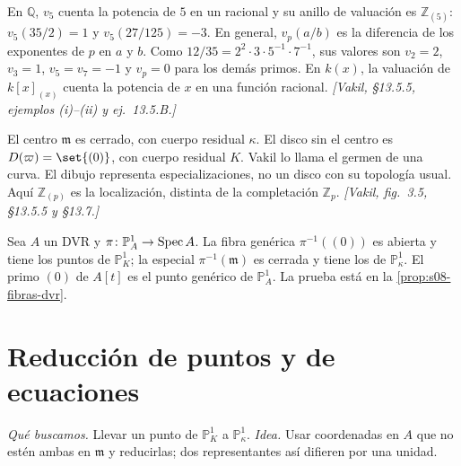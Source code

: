 \begin{ejem}[Valuaciones]
\label{ejem:s09-valuaciones}
En $\mathbb Q$, $v_5$ cuenta la potencia de $5$ en un racional y su anillo de valuación es $\mathbb Z_{(5)}$: $v_5(35/2)=1$ y $v_5(27/125)=-3$. En general, $v_p(a/b)$ es la diferencia de los exponentes de $p$ en $a$ y $b$. Como $12/35=2^2\cdot3\cdot5^{-1}\cdot7^{-1}$, sus valores son $v_2=2$, $v_3=1$, $v_5=v_7=-1$ y $v_p=0$ para los demás primos. En $k(x)$, la valuación de $k[x]_{(x)}$ cuenta la potencia de $x$ en una función racional. \emph{[Vakil, \S13.5.5, ejemplos (i)--(ii) y ej.~13.5.B.]}
\end{ejem}

\begin{center}
\begin{minipage}{.32\textwidth}
\centering
{}
\end{minipage}\hfill
\begin{minipage}{.63\textwidth}
El centro $\mathfrak m$ es cerrado, con cuerpo residual $\kappa$. El disco sin el centro es $D(\varpi)=\set{(0)}$, con cuerpo residual $K$. Vakil lo llama el germen de una curva. El dibujo representa especializaciones, no un disco con su topología usual. Aquí $\mathbb Z_{(p)}$ es la localización, distinta de la completación $\mathbb Z_p$. \emph{[Vakil, fig.~3.5, \S13.5.5 y \S13.7.]}
\end{minipage}
\end{center}

\begin{prop}
\label{prop:s09-fibras-dvr}
Sea $A$ un DVR y $\pi\colon \mathbb P^1_A\to\operatorname{Spec} A$. La fibra genérica $\pi^{-1}((0))$ es abierta y tiene los puntos de $\mathbb P^1_K$; la especial $\pi^{-1}(\mathfrak m)$ es cerrada y tiene los de $\mathbb P^1_{\kappa}$. El primo $(0)$ de $A[t]$ es el punto genérico de $\mathbb P^1_A$. La prueba está en la \cref{prop:s08-fibras-dvr}.
\end{prop}

\section{Reducción de puntos y de ecuaciones}
\emph{Qué buscamos.} Llevar un punto de $\mathbb P^1_K$ a $\mathbb P^1_{\kappa}$. \emph{Idea.} Usar coordenadas en $A$ que no estén ambas en $\mathfrak m$ y reducirlas; dos representantes así difieren por una unidad.

